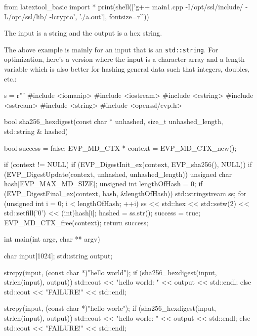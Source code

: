 \vspace{-0.1cm}
\begin{python}
from latextool_basic import *
print(shell(['g++ main1.cpp -I/opt/ssl/include/ -L/opt/ssl/lib/ -lcrypto', './a.out'], fontsize=r'\scriptsize'))
\end{python}
The input is a string and the output
is a hex string.

The above example is mainly for an input that is an \verb!std::string!.
For optimization,
here's a version where the input is a character array
and a length variable
which is also better for hashing general data
such that integers, doubles, etc.:

\begin{python}
s = r'''
#include <iomanip>
#include <iostream>
#include <cstring>
#include <sstream>
#include <string>
#include <openssl/evp.h>

bool sha256_hexdigest(const char * unhashed, size_t unhashed_length,
                   std::string & hashed)
{
    bool success = false;
    EVP_MD_CTX * context = EVP_MD_CTX_new();

    if (context != NULL)
    {
        if (EVP_DigestInit_ex(context, EVP_sha256(), NULL))
        {
            if (EVP_DigestUpdate(context,
                                 unhashed, unhashed_length))
            {
                unsigned char hash[EVP_MAX_MD_SIZE];
                unsigned int lengthOfHash = 0;
                if (EVP_DigestFinal_ex(context, hash, &lengthOfHash))
                {
                    std::stringstream ss;
                    for (unsigned int i = 0; i < lengthOfHash; ++i)
                    {
                        ss << std::hex << std::setw(2) << std::setfill('0')
                           << (int)hash[i];
                    }
                    hashed = ss.str();
                    success = true;
                }
            }
        }
        EVP_MD_CTX_free(context);
    }
    return success;
}

int main(int argc, char ** argv)
{  
    char input[1024];
    std::string output;

    strcpy(input, (const char *)"hello world");
    if (sha256_hexdigest(input, strlen(input), output))
    {
        std::cout << "hello world: " << output << std::endl;
    }
    else
    {
        std::cout << "FAILURE!" << std::endl;
    }
    
    strcpy(input, (const char *)"hello worle");
    if (sha256_hexdigest(input, strlen(input), output))
    {
        std::cout << "hello worle: " << output << std::endl;
    }
    else
    {
        std::cout << "FAILURE!" << std::endl;
    }

}
\end{python}
